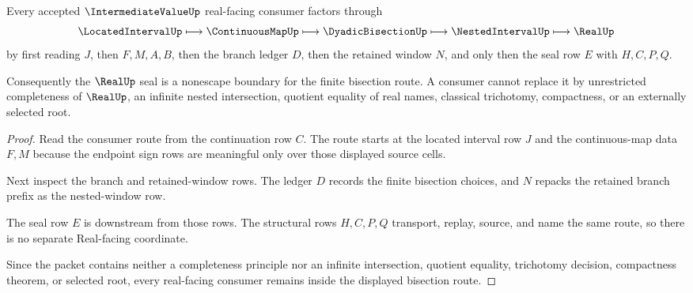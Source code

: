 \begin{theorem}
\label{thm:intermediatevalue-real-seal-nonescape}
Every accepted $\IntermediateValueUp$ real-facing consumer factors through
$$
\LocatedIntervalUp \longmapsto \ContinuousMapUp \longmapsto \DyadicBisectionUp \longmapsto \NestedIntervalUp \longmapsto \RealUp
$$
by first reading $J$, then $F,M,A,B$, then the branch ledger $D$, then the retained window $N$, and only then the seal row $E$ with $H,C,P,Q$.

Consequently the $\RealUp$ seal is a nonescape boundary for the finite bisection route. A consumer cannot replace it by unrestricted completeness of $\RealUp$, an infinite nested intersection, quotient equality of real names, classical trichotomy, compactness, or an externally selected root.
\end{theorem}
\begin{proof}
Read the consumer route from the continuation row $C$. The route starts at the located interval row $J$ and the continuous-map data $F,M$ because the endpoint sign rows are meaningful only over those displayed source cells.

Next inspect the branch and retained-window rows. The ledger $D$ records the finite bisection choices, and $N$ repacks the retained branch prefix as the nested-window row.

The seal row $E$ is downstream from those rows. The structural rows $H,C,P,Q$ transport, replay, source, and name the same route, so there is no separate Real-facing coordinate.

Since the packet contains neither a completeness principle nor an infinite intersection, quotient equality, trichotomy decision, compactness theorem, or selected root, every real-facing consumer remains inside the displayed bisection route.
\end{proof}

